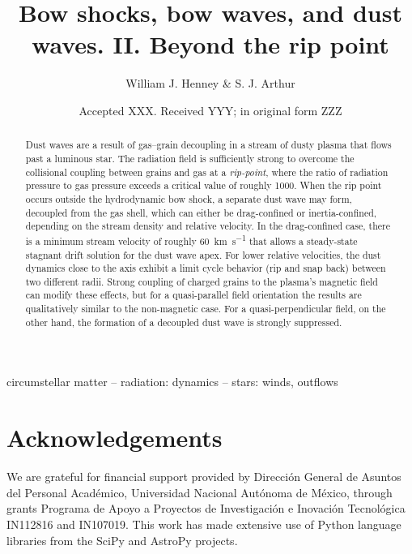 \documentclass[useAMS, usenatbib, a4paper]{mnras}
\title
{Bow shocks, bow waves, and dust waves. II. Beyond the rip point}
\author[Henney \& Arthur]{
  William J. Henney \& S. J. Arthur\\
  \AddressCRyA
}
\date{Accepted XXX. Received YYY; in original form ZZZ}
\begin{document}
\label{firstpage}
\pagerange{\pageref{firstpage}--\pageref{lastpage}}
\maketitle
\begin{abstract}
  Dust waves are a result of gas--grain decoupling in a stream of
  dusty plasma that flows past a luminous star.  The radiation field
  is sufficiently strong to overcome the collisional coupling between
  grains and gas at a \textit{rip-point}, where the ratio of radiation
  pressure to gas pressure exceeds a critical value of roughly 1000.
  When the rip point occurs outside the hydrodynamic bow shock, a
  separate dust wave may form, decoupled from the gas shell, which can
  either be drag-confined or inertia-confined, depending on the stream
  density and relative velocity.  In the drag-confined case, there is
  a minimum stream velocity of roughly \SI{60}{km.s^{-1}} that allows
  a steady-state stagnant drift solution for the dust wave apex.  For
  lower relative velocities, the dust dynamics close to the axis
  exhibit a limit cycle behavior (rip and snap back) between two
  different radii.  Strong coupling of charged grains to the plasma's
  magnetic field can modify these effects, but for a quasi-parallel
  field orientation the results are qualitatively similar to the
  non-magnetic case. For a quasi-perpendicular field, on the other
  hand, the formation of a decoupled dust wave is strongly suppressed.
\end{abstract}

\begin{keywords}
  circumstellar matter -- radiation: dynamics -- stars: winds, outflows
\end{keywords}



\section*{Acknowledgements}
We are grateful for financial support provided by Dirección General de
Asuntos del Personal Académico, Universidad Nacional Autónoma de
México, through grants Programa de Apoyo a Proyectos de Investigación
e Inovación Tecnológica IN112816 and IN107019.  This work has made
extensive use of Python language libraries from the SciPy
\citep{Jones:2001a} and AstroPy \citep{Astropy-Collaboration:2013a,
  Astropy-Collaboration:2018a} projects.




\appendix




\bsp	%
\label{lastpage}
\end{document}
